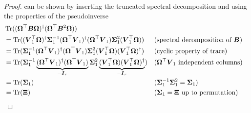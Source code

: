 \begin{proof}
     can be shown by inserting the truncated
    spectral decomposition 
    and using the properties of the pseudoinverse
    \begin{align*}
        &\operatorname{Tr}((\boldsymbol{\Omega}^{\top} \boldsymbol{B} \boldsymbol{\Omega})^{\dagger}(\boldsymbol{\Omega}^{\top} \boldsymbol{B}^2 \boldsymbol{\Omega})) \notag \\
            &= \operatorname{Tr}((\boldsymbol{V}_1^{\top} \boldsymbol{\Omega})^{\dagger} \boldsymbol{\Sigma}_1^{-1} (\boldsymbol{\Omega}^{\top} \boldsymbol{V}_1)^{\dagger} (\boldsymbol{\Omega}^{\top} \boldsymbol{V}_1) \boldsymbol{\Sigma}_1^2 (\boldsymbol{V}_1^{\top} \boldsymbol{\Omega})) &&\text{(spectral decomposition of $\boldsymbol{B}$)} \notag \\
            &= \operatorname{Tr}(\boldsymbol{\Sigma}_1^{-1} (\boldsymbol{\Omega}^{\top} \boldsymbol{V}_1)^{\dagger} (\boldsymbol{\Omega}^{\top} \boldsymbol{V}_1)\boldsymbol{\Sigma}_1^2 (\boldsymbol{V}_1^{\top} \boldsymbol{\Omega}) (\boldsymbol{V}_1^{\top} \boldsymbol{\Omega})^{\dagger}) &&\text{(cyclic property of trace)} \notag \\
            &= \operatorname{Tr}(\boldsymbol{\Sigma}_1^{-1} \underbrace{(\boldsymbol{\Omega}^{\top} \boldsymbol{V}_1)^{\dagger} (\boldsymbol{\Omega}^{\top} \boldsymbol{V}_1)}_{=\boldsymbol{I}_r} \boldsymbol{\Sigma}_1^2 \underbrace{(\boldsymbol{V}_1^{\top} \boldsymbol{\Omega}) (\boldsymbol{V}_1^{\top} \boldsymbol{\Omega})^{\dagger}}_{=\boldsymbol{I}_r}) &&\text{($\boldsymbol{\Omega}^{\top} \boldsymbol{V}_1$ independent columns)} \notag \\
            &= \operatorname{Tr}(\boldsymbol{\Sigma}_1) &&\text{($\boldsymbol{\Sigma}_1^{-1} \boldsymbol{\Sigma}_1^{2} = \boldsymbol{\Sigma}_1$)}  \notag \\
            &= \operatorname{Tr}(\boldsymbol{\Xi}) &&\text{($\boldsymbol{\Sigma}_1 = \boldsymbol{\Xi}$ up to permutation)}
    \end{align*}
\end{proof}

